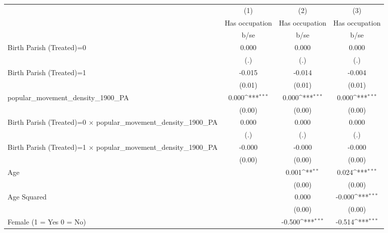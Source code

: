 {
\def\sym#1{\ifmmode^{#1}\else\(^{#1}\)\fi}
\begin{tabular}{l*{3}{c}}
\hline\hline
                    &\multicolumn{1}{c}{(1)}&\multicolumn{1}{c}{(2)}&\multicolumn{1}{c}{(3)}\\
                    &\multicolumn{1}{c}{Has occupation}&\multicolumn{1}{c}{Has occupation}&\multicolumn{1}{c}{Has occupation}\\
                    &        b/se         &        b/se         &        b/se         \\
\hline
Birth Parish (Treated)=0&       0.000         &       0.000         &       0.000         \\
                    &         (.)         &         (.)         &         (.)         \\
Birth Parish (Treated)=1&      -0.015         &      -0.014         &      -0.004         \\
                    &      (0.01)         &      (0.01)         &      (0.01)         \\
popular\_movement\_density\_1900\_PA&       0.000\sym{***}&       0.000\sym{***}&       0.000\sym{***}\\
                    &      (0.00)         &      (0.00)         &      (0.00)         \\
Birth Parish (Treated)=0 $\times$ popular\_movement\_density\_1900\_PA&       0.000         &       0.000         &       0.000         \\
                    &         (.)         &         (.)         &         (.)         \\
Birth Parish (Treated)=1 $\times$ popular\_movement\_density\_1900\_PA&      -0.000         &      -0.000         &      -0.000         \\
                    &      (0.00)         &      (0.00)         &      (0.00)         \\
Age                 &                     &       0.001\sym{**} &       0.024\sym{***}\\
                    &                     &      (0.00)         &      (0.00)         \\
Age Squared         &                     &       0.000         &      -0.000\sym{***}\\
                    &                     &      (0.00)         &      (0.00)         \\
Female (1 = Yes 0 = No)&                     &      -0.500\sym{***}&      -0.514\sym{***}\\

\end{tabular}}
